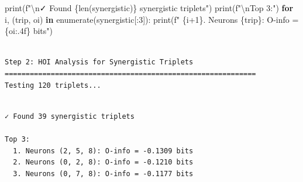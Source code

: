\documentclass[
  11pt,
  letterpaper,
  oneside,
  openany]{book}
\newenvironment{Shaded}{\begin{snugshade}}{\end{snugshade}}
\newcommand{\BuiltInTok}[1]{\textcolor[rgb]{0.00,0.23,0.31}{#1}}
\newcommand{\CharTok}[1]{\textcolor[rgb]{0.13,0.47,0.30}{#1}}
\newcommand{\ControlFlowTok}[1]{\textcolor[rgb]{0.00,0.23,0.31}{\textbf{#1}}}
\newcommand{\DecValTok}[1]{\textcolor[rgb]{0.68,0.00,0.00}{#1}}
\newcommand{\KeywordTok}[1]{\textcolor[rgb]{0.00,0.23,0.31}{\textbf{#1}}}
\newcommand{\NormalTok}[1]{\textcolor[rgb]{0.00,0.23,0.31}{#1}}
\newcommand{\OperatorTok}[1]{\textcolor[rgb]{0.37,0.37,0.37}{#1}}
\newcommand{\SpecialCharTok}[1]{\textcolor[rgb]{0.37,0.37,0.37}{#1}}
\newcommand{\SpecialStringTok}[1]{\textcolor[rgb]{0.13,0.47,0.30}{#1}}
\begin{document}
\begin{Shaded}
\begin{Highlighting}[]
\BuiltInTok{print}\NormalTok{(}\SpecialStringTok{f"}\CharTok{\textbackslash{}n}\SpecialStringTok{✓ Found }\SpecialCharTok{\{}\BuiltInTok{len}\NormalTok{(synergistic)}\SpecialCharTok{\}}\SpecialStringTok{ synergistic triplets"}\NormalTok{)}
\BuiltInTok{print}\NormalTok{(}\SpecialStringTok{f"}\CharTok{\textbackslash{}n}\SpecialStringTok{Top 3:"}\NormalTok{)}
\ControlFlowTok{for}\NormalTok{ i, (trip, oi) }\KeywordTok{in} \BuiltInTok{enumerate}\NormalTok{(synergistic[:}\DecValTok{3}\NormalTok{]):}
    \BuiltInTok{print}\NormalTok{(}\SpecialStringTok{f"  }\SpecialCharTok{\{}\NormalTok{i}\OperatorTok{+}\DecValTok{1}\SpecialCharTok{\}}\SpecialStringTok{. Neurons }\SpecialCharTok{\{}\NormalTok{trip}\SpecialCharTok{\}}\SpecialStringTok{: O{-}info = }\SpecialCharTok{\{}\NormalTok{oi}\SpecialCharTok{:.4f\}}\SpecialStringTok{ bits"}\NormalTok{)}
\end{Highlighting}
\end{Shaded}

\begin{verbatim}

Step 2: HOI Analysis for Synergistic Triplets
============================================================
Testing 120 triplets...
\end{verbatim}

\begin{verbatim}

✓ Found 39 synergistic triplets

Top 3:
  1. Neurons (2, 5, 8): O-info = -0.1309 bits
  2. Neurons (0, 2, 8): O-info = -0.1210 bits
  3. Neurons (0, 7, 8): O-info = -0.1177 bits
\end{verbatim}
\end{document}
